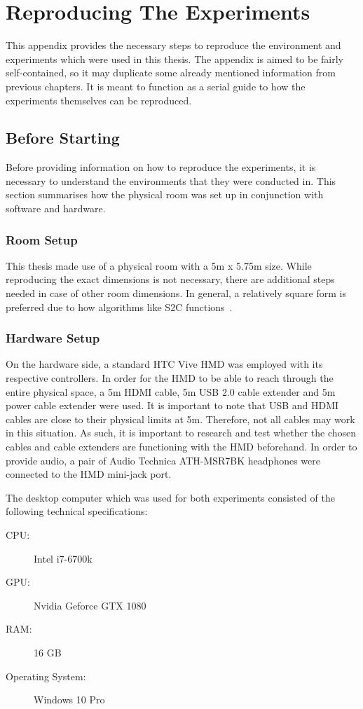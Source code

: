 \chapter{Reproducing The Experiments} \label{app:reproduction}
This appendix provides the necessary steps to reproduce the environment and experiments which were used in this thesis. The appendix is aimed to be fairly self-contained, so it may duplicate some already mentioned information from previous chapters. It is meant to function as a serial guide to how the experiments themselves can be reproduced. 

\section{Before Starting}
Before providing information on how to reproduce the experiments, it is necessary to understand the environments that they were conducted in. This section summarises how the physical room was set up in conjunction with software and hardware.

\subsection{Room Setup}
This thesis made use of a physical room with a 5m x 5.75m size. While reproducing the exact dimensions is not necessary, there are additional steps needed in case of other room dimensions. In general, a relatively square form is preferred due to how algorithms like S2C functions~\cite{azmandian2015physical}. 

\subsection{Hardware Setup}
On the hardware side, a standard HTC Vive HMD was employed with its respective controllers. In order for the HMD to be able to reach through the entire physical space, a 5m HDMI cable, 5m USB 2.0 cable extender and 5m power cable extender were used. It is important to note that USB and HDMI cables are close to their physical limits at 5m. Therefore, not all cables may work in this situation. As such, it is important to research and test whether the chosen cables and cable extenders are functioning with the HMD beforehand. In order to provide audio, a pair of Audio Technica ATH-MSR7BK headphones were connected to the HMD mini-jack port. 

The desktop computer which was used for both experiments consisted of the following technical specifications:
\begin{description}
   \item[CPU:] Intel i7-6700k
   \item[GPU:] Nvidia Geforce GTX 1080
   \item[RAM:] 16 GB
   \item[Operating System:] Windows 10 Pro
\end{description}


